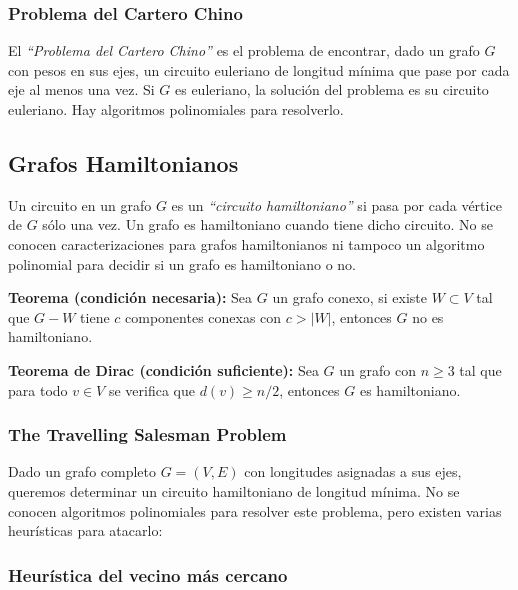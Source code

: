 \subsubsection{Problema del Cartero Chino}

El \emph{``Problema del Cartero Chino''} es el problema de encontrar, dado un grafo $G$ con pesos en sus ejes, un circuito euleriano de longitud m\'inima que pase por cada eje al menos una vez. Si $G$ es euleriano, la soluci\'on del problema es su circuito euleriano. Hay algoritmos polinomiales para resolverlo.


\newpage
\subsection{Grafos Hamiltonianos}

Un circuito en un grafo $G$ es un \emph{``circuito hamiltoniano''} si pasa por cada v\'ertice de $G$ s\'olo una vez. Un grafo es hamiltoniano cuando tiene dicho circuito. No se conocen caracterizaciones para grafos hamiltonianos ni tampoco un algoritmo polinomial para decidir si un grafo es hamiltoniano o no.

\newenvironment{badidea}
  {\par\leftskip=1cm}
  {\par}

\begin{badidea}
\textbf{Teorema (condici\'on necesaria):} Sea $G$ un grafo conexo, si existe $W \subset V$ tal que $G - W$ tiene $c$ componentes conexas con $c > |W|$, entonces $G$ no es hamiltoniano.
\end{badidea}

\begin{badidea}
\textbf{Teorema de Dirac (condici\'on suficiente):} Sea $G$ un grafo con $n \geq 3$ tal que para todo $v \in V$ se verifica que $d(v) \geq n/2$, entonces $G$ es hamiltoniano.
\end{badidea}

\subsubsection{The Travelling Salesman Problem}

Dado un grafo completo $G = (V, E)$ con longitudes asignadas a sus ejes, queremos determinar un circuito hamiltoniano de longitud m\'inima. No se conocen algoritmos polinomiales para resolver este problema, pero existen varias heur\'isticas para atacarlo:

\subsubsection*{Heur\'istica del vecino m\'as cercano}

